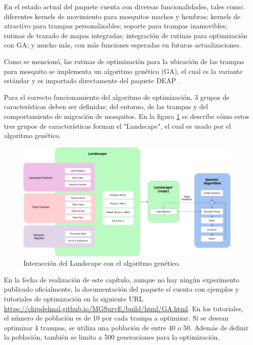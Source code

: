   En el estado actual del paquete cuenta con diversas funcionalidades, tales
  como: diferentes kernels de movimiento para mosquitos machos y hembras;
  kernels de atractivo para trampas personalizables; soporte para trampas
  inamovibles; rutinas de trazado de mapas integradas; integración de rutinas
  para optimización con GA; y mucho más, con más funciones esperadas en
  futuras actualizaciones.

  Como se mencionó, las rutinas de optimización para la ubicación de las
  trampas para mosquito se implementa un algoritmo genético (GA), el cual es
  la variante estándar y es importado directamente del paquete DEAP
  \cite{DEAP}.

  Para el correcto funcionamiento del algoritmo de optimización, 3 grupos de
  características deben ser definidas: del entorno, de las trampas y del
  comportamiento de migración de mosquitos. En la figura
  \ref{fig:mgsurve-landscape-diagram} se describe cómo estos tres grupos de
  características forman el "Landscape", el cual es usado por el algoritmo 
  genético. 

  \begin{figure}[ht!]
    \includegraphics[width=\textwidth]{fig:mgsurve-landscape-diagram.jpeg}
    \centering
    \caption{Interacción del Landscape con el algoritmo genético.}
    \label{fig:mgsurve-landscape-diagram}
    \centering
  \end{figure}

  En la fecha de realización de este capítulo, aunque no hay ningún
  experimento publicado oficialmente, la documentación del paquete sí cuenta
  con ejemplos y tutoriales de optimización en la siguiente URL
  \url{https://chipdelmal.github.io/MGSurvE/build/html/GA.html}. En los
  tutoriales, el número de población es de 10 por cada trampa a optimizar. Si
  se desean optimizar 4 trampas, se utiliza una población de entre 40 o 50.
  Además de definir la población, también se limita a 500 generaciones para
  la optimización.

